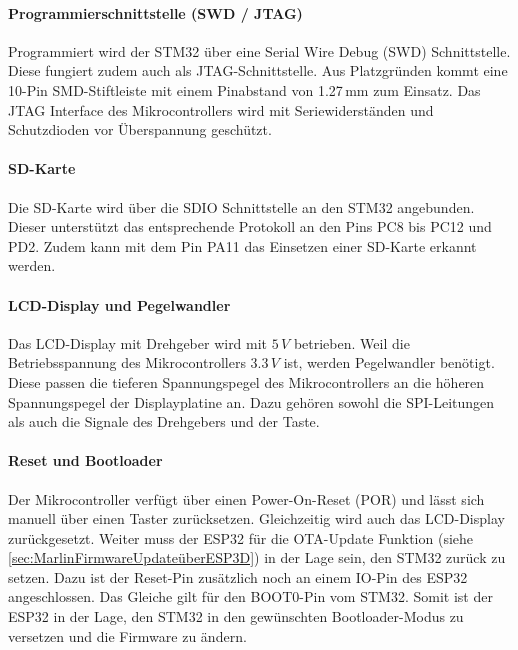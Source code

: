 \paragraph{Programmierschnittstelle (SWD / JTAG)}
Programmiert wird der STM32 über eine Serial Wire Debug (SWD) Schnittstelle. Diese fungiert zudem auch als JTAG-Schnittstelle. Aus Platzgründen kommt eine 10-Pin SMD-Stiftleiste mit einem Pinabstand von 1.27\,mm zum Einsatz. Das JTAG Interface des Mikrocontrollers wird mit Seriewiderständen und Schutzdioden vor Überspannung geschützt.\\


\paragraph{SD-Karte}
Die SD-Karte wird über die SDIO Schnittstelle an den STM32 angebunden. Dieser unterstützt das entsprechende Protokoll an den Pins PC8 bis PC12 und PD2. Zudem kann mit dem Pin PA11 das Einsetzen einer SD-Karte erkannt werden.\\


\paragraph{LCD-Display und Pegelwandler}
Das LCD-Display mit Drehgeber wird mit $5\,\si{V}$ betrieben. Weil die Betriebsspannung des Mikrocontrollers $3.3\,\si{V}$ ist, werden Pegelwandler benötigt. Diese passen die tieferen Spannungspegel des Mikrocontrollers an die höheren Spannungspegel der Displayplatine an. Dazu gehören sowohl die SPI-Leitungen als auch die Signale des Drehgebers und der Taste.\\


\paragraph{Reset und Bootloader}
Der Mikrocontroller verfügt über einen Power-On-Reset (POR) und lässt sich manuell über einen Taster zurücksetzen. Gleichzeitig wird auch das LCD-Display zurückgesetzt. Weiter muss der ESP32 für die OTA-Update Funktion (siehe \ref{sec:MarlinFirmwareUpdateüberESP3D}) in der Lage sein, den STM32 zurück zu setzen. Dazu ist der Reset-Pin zusätzlich noch an einem IO-Pin des ESP32 angeschlossen. Das Gleiche gilt für den BOOT0-Pin vom STM32. Somit ist der ESP32 in der Lage, den STM32 in den gewünschten Bootloader-Modus zu versetzen und die Firmware zu ändern.


